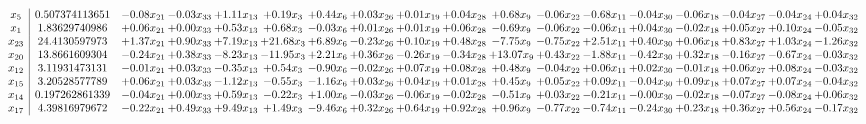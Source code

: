 \documentclass[9pt]{article}
\begin{document}
 \[\begin{array}{c| c c@{\hskip 2pt} c@{\hskip 2pt} c@{\hskip 2pt} c@{\hskip 2pt} c@{\hskip 2pt} c@{\hskip 2pt} c@{\hskip 2pt} c@{\hskip 2pt} c@{\hskip 2pt} c@{\hskip 2pt} c@{\hskip 2pt} c@{\hskip 2pt} c@{\hskip 2pt} c@{\hskip 2pt} c@{\hskip 2pt} c@{\hskip 2pt} }
 x_{5}   &  0.507374113651 & -0.08 x_{21} & -0.03 x_{33} & +  1.11 x_{13} & +  0.19 x_{3} & +  0.44 x_{6} & +  0.03 x_{26} & +  0.01 x_{19} & +  0.04 x_{28} & +  0.68 x_{9} & -0.06 x_{22} & -0.68 x_{11} & -0.04 x_{30} & -0.06 x_{18} & -0.04 x_{27} & -0.04 x_{24} & +  0.04 x_{32}\\
 x_{1}   &  1.83629740986 & +  0.06 x_{21} & +  0.00 x_{33} & +  0.53 x_{13} & +  0.68 x_{3} & -0.03 x_{6} & +  0.01 x_{26} & +  0.01 x_{19} & +  0.06 x_{28} & -0.69 x_{9} & -0.06 x_{22} & -0.06 x_{11} & +  0.04 x_{30} & -0.02 x_{18} & +  0.05 x_{27} & +  0.10 x_{24} & -0.05 x_{32}\\
 x_{23}   &  24.4130597973 & +  1.37 x_{21} & +  0.90 x_{33} & +  7.19 x_{13} & + 21.68 x_{3} & +  6.89 x_{6} & -0.23 x_{26} & +  0.10 x_{19} & +  0.48 x_{28} & -7.75 x_{9} & -0.75 x_{22} & +  2.51 x_{11} & +  0.40 x_{30} & +  0.06 x_{18} & +  0.83 x_{27} & +  1.03 x_{24} & -1.26 x_{32}\\
 x_{20}   &  13.8661609304 & -0.24 x_{21} & +  0.38 x_{33} & -8.23 x_{13} & -11.95 x_{3} & +  2.21 x_{6} & +  0.36 x_{26} & -0.26 x_{19} & -0.34 x_{28} & + 13.07 x_{9} & +  0.43 x_{22} & -1.88 x_{11} & -0.42 x_{30} & +  0.32 x_{18} & -0.16 x_{27} & -0.67 x_{24} & -0.03 x_{32}\\
 x_{12}   &  3.11931473131 & -0.01 x_{21} & +  0.03 x_{33} & -0.35 x_{13} & +  0.54 x_{3} & -0.90 x_{6} & -0.02 x_{26} & +  0.07 x_{19} & +  0.08 x_{28} & +  0.48 x_{9} & -0.04 x_{22} & +  0.06 x_{11} & +  0.02 x_{30} & -0.01 x_{18} & +  0.06 x_{27} & +  0.08 x_{24} & -0.03 x_{32}\\
 x_{15}   &  3.20528577789 & +  0.06 x_{21} & +  0.03 x_{33} & -1.12 x_{13} & -0.55 x_{3} & -1.16 x_{6} & +  0.03 x_{26} & +  0.04 x_{19} & +  0.01 x_{28} & +  0.45 x_{9} & +  0.05 x_{22} & +  0.09 x_{11} & -0.04 x_{30} & +  0.09 x_{18} & +  0.07 x_{27} & +  0.07 x_{24} & -0.04 x_{32}\\
 x_{14}   &  0.197262861339 & -0.04 x_{21} & +  0.00 x_{33} & +  0.59 x_{13} & -0.22 x_{3} & +  1.00 x_{6} & -0.03 x_{26} & -0.06 x_{19} & -0.02 x_{28} & -0.51 x_{9} & +  0.03 x_{22} & -0.21 x_{11} & -0.00 x_{30} & -0.02 x_{18} & -0.07 x_{27} & -0.08 x_{24} & +  0.06 x_{32}\\
 x_{17}   &  4.39816979672 & -0.22 x_{21} & +  0.49 x_{33} & +  9.49 x_{13} & +  1.49 x_{3} & -9.46 x_{6} & +  0.32 x_{26} & +  0.64 x_{19} & +  0.92 x_{28} & +  0.96 x_{9} & -0.77 x_{22} & -0.74 x_{11} & -0.24 x_{30} & +  0.23 x_{18} & +  0.36 x_{27} & +  0.56 x_{24} & -0.17 x_{32}\\

\end{array}\]
\end{document}
